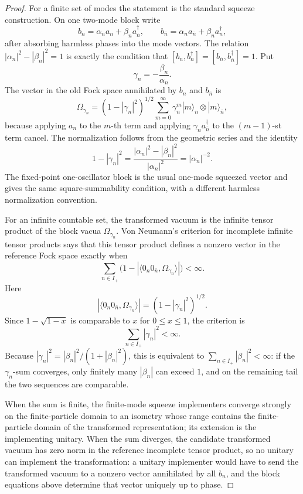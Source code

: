 \begin{proof}
For a finite set of modes the statement is the standard squeeze
construction.  On one two-mode block write
\[
  b_n=\alpha_n a_n+\beta_n a_{\bar n}^{\dagger},
  \qquad
  b_{\bar n}=\alpha_n a_{\bar n}+\beta_n a_n^\dagger ,
\]
after absorbing harmless phases into the mode vectors.  The relation
\(|\alpha_n|^2-|\beta_n|^2=1\) is exactly the condition that
\([b_n,b_n^\dagger]=[b_{\bar n},b_{\bar n}^\dagger]=1\).  Put
\[
  \gamma_n=-\frac{\beta_n}{\alpha_n}.
\]
The vector in the old Fock space annihilated by \(b_n\) and \(b_{\bar n}\)
is
\begin{equation}
  \Omega_{\gamma_n}
  =
  (1-|\gamma_n|^2)^{1/2}
  \sum_{m=0}^\infty \gamma_n^m
  |m\rangle_n\otimes |m\rangle_{\bar n},
  \label{eq:two-mode-squeezed-vacuum}
\end{equation}
because applying \(a_n\) to the \(m\)-th term and applying
\(\gamma_n a_{\bar n}^\dagger\) to the \((m-1)\)-st term cancel.  The
normalization follows from the geometric series and the identity
\[
  1-|\gamma_n|^2
  =
  \frac{|\alpha_n|^2-|\beta_n|^2}{|\alpha_n|^2}
  =
  |\alpha_n|^{-2}.
  \]
The fixed-point one-oscillator block is the usual one-mode squeezed vector
and gives the same square-summability condition, with a different harmless
normalization convention.

For an infinite countable set, the transformed vacuum is the infinite tensor
product of the block vacua \(\Omega_{\gamma_n}\).  Von Neumann's criterion
for incomplete infinite tensor products says that this tensor product defines
a nonzero vector in the reference Fock space exactly when
\[
  \sum_{n\in I_+}
  \bigl(1-|\langle 0_n0_{\bar n},\Omega_{\gamma_n}\rangle|\bigr)<\infty .
\]
Here
\[
  |\langle 0_n0_{\bar n},\Omega_{\gamma_n}\rangle|
  =
  (1-|\gamma_n|^2)^{1/2}.
\]
Since \(1-\sqrt{1-x}\) is comparable to \(x\) for \(0\le x\le1\), the
criterion is
\[
  \sum_{n\in I_+}|\gamma_n|^2<\infty .
\]
Because \(|\gamma_n|^2=|\beta_n|^2/(1+|\beta_n|^2)\), this is equivalent to
\(\sum_{n\in I_+}|\beta_n|^2<\infty\): if the \(\gamma_n\)-sum converges,
only finitely many \(|\beta_n|\) can exceed \(1\), and on the remaining tail
the two sequences are comparable.

When the sum is finite, the finite-mode squeeze implementers converge
strongly on the finite-particle domain to an isometry whose range contains
the finite-particle domain of the transformed representation; its extension
is the implementing unitary.  When the sum diverges, the candidate
transformed vacuum has zero norm in the reference incomplete tensor product,
so no unitary can implement the transformation: a unitary implementer would
have to send the transformed vacuum to a nonzero vector annihilated by all
\(b_n\), and the block equations above determine that vector uniquely up to
phase.
\end{proof}

